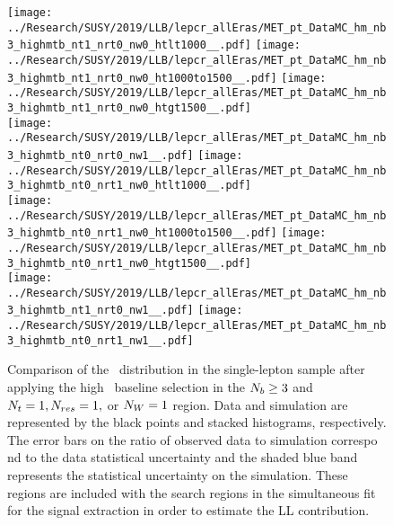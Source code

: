\begin{figure}[!htb]
	\begin{center}
  \texttt{[image: ../Research/SUSY/2019/LLB/lepcr\_allEras/MET\_pt\_DataMC\_hm\_nb3\_highmtb\_nt1\_nrt0\_nw0\_htlt1000\_\_.pdf]}
  \texttt{[image: ../Research/SUSY/2019/LLB/lepcr\_allEras/MET\_pt\_DataMC\_hm\_nb3\_highmtb\_nt1\_nrt0\_nw0\_ht1000to1500\_\_.pdf]} 
  \texttt{[image: ../Research/SUSY/2019/LLB/lepcr\_allEras/MET\_pt\_DataMC\_hm\_nb3\_highmtb\_nt1\_nrt0\_nw0\_htgt1500\_\_.pdf]} \\
  \texttt{[image: ../Research/SUSY/2019/LLB/lepcr\_allEras/MET\_pt\_DataMC\_hm\_nb3\_highmtb\_nt0\_nrt0\_nw1\_\_.pdf]} 
  \texttt{[image: ../Research/SUSY/2019/LLB/lepcr\_allEras/MET\_pt\_DataMC\_hm\_nb3\_highmtb\_nt0\_nrt1\_nw0\_htlt1000\_\_.pdf]} \\
  \texttt{[image: ../Research/SUSY/2019/LLB/lepcr\_allEras/MET\_pt\_DataMC\_hm\_nb3\_highmtb\_nt0\_nrt1\_nw0\_ht1000to1500\_\_.pdf]}  
  \texttt{[image: ../Research/SUSY/2019/LLB/lepcr\_allEras/MET\_pt\_DataMC\_hm\_nb3\_highmtb\_nt0\_nrt1\_nw0\_htgt1500\_\_.pdf]} \\
  \texttt{[image: ../Research/SUSY/2019/LLB/lepcr\_allEras/MET\_pt\_DataMC\_hm\_nb3\_highmtb\_nt1\_nrt0\_nw1\_\_.pdf]} 
  \texttt{[image: ../Research/SUSY/2019/LLB/lepcr\_allEras/MET\_pt\_DataMC\_hm\_nb3\_highmtb\_nt0\_nrt1\_nw1\_\_.pdf]} \\
	\end{center}
	\caption{Comparison of the \met~distribution in the single-lepton sample after applying the high \dm~baseline selection in the $N_{b}\geq3$ and $N_{t}=1, N_{res}=1,$ or $N_{W}=1$ region. Data and simulation are represented by the black points and stacked histograms, respectively. The error bars on the ratio of observed data to simulation correspo    nd to the data statistical uncertainty and the shaded blue band represents the statistical uncertainty on the simulation. These regions are included with the search regions in the simultaneous fit for the signal extraction in order to estimate the LL contribution.
	 }
	\label{fig:llb-1lcr-datavsmc-hm-nb3-1}
\end{figure}

